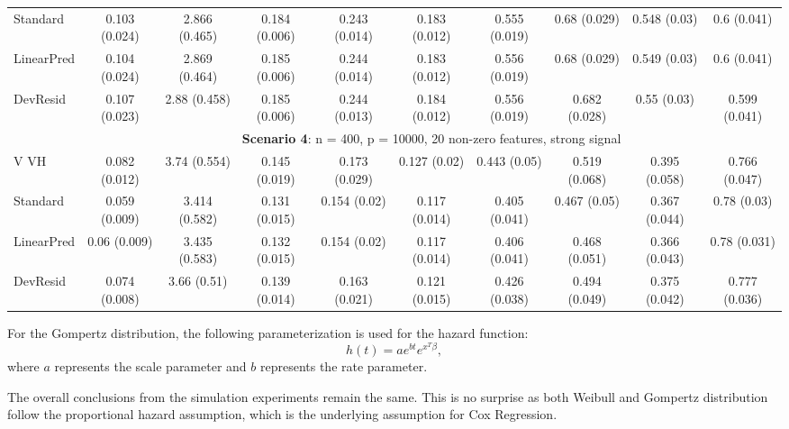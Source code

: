 \documentclass{article}
\begin{document}
\begin{landscape}
\begin{table}[h]
\begin{tabular}[t]{lccccccccc}
Standard  & 0.103 (0.024) & 2.866 (0.465) & 0.184 (0.006) & 0.243 (0.014) & 0.183 (0.012) & 0.555 (0.019) & 0.68 (0.029) & 0.548 (0.03) & 0.6 (0.041) \\ 
LinearPred  & 0.104 (0.024) & 2.869 (0.464) & 0.185 (0.006) & 0.244 (0.014) & 0.183 (0.012) & 0.556 (0.019) & 0.68 (0.029) & 0.549 (0.03) & 0.6 (0.041) \\   
 DevResid  & 0.107 (0.023) & 2.88 (0.458) & 0.185 (0.006) & 0.244 (0.013) & 0.184 (0.012) & 0.556 (0.019) & 0.682 (0.028) & 0.55 (0.03) & 0.599 (0.041) \\
\addlinespace
&\multicolumn{9}{c}{\textbf{Scenario 4}: n = 400, p = 10000, 20 non-zero features, strong signal}\\
\cline{2-10}
 V VH  & 0.082 (0.012) & 3.74 (0.554) & 0.145 (0.019) & 0.173 (0.029) & 0.127 (0.02) & 0.443 (0.05) & 0.519 (0.068) & 0.395 (0.058) & 0.766 (0.047) \\  
Standard  & 0.059 (0.009) & 3.414 (0.582) & 0.131 (0.015) & 0.154 (0.02) & 0.117 (0.014) & 0.405 (0.041) & 0.467 (0.05) & 0.367 (0.044) & 0.78 (0.03) \\   
LinearPred  & 0.06 (0.009) & 3.435 (0.583) & 0.132 (0.015) & 0.154 (0.02) & 0.117 (0.014) & 0.406 (0.041) & 0.468 (0.051) & 0.366 (0.043) & 0.78 (0.031) \\   
 DevResid  & 0.074 (0.008) & 3.66 (0.51) & 0.139 (0.014) & 0.163 (0.021) & 0.121 (0.015) & 0.426 (0.038) & 0.494 (0.049) & 0.375 (0.042) & 0.777 (0.036) \\
\bottomrule
\end{tabular}
\end{table}

For the Gompertz distribution, the following parameterization is used for the hazard function:
$$h(t) = a e^{b t}e^{x^{T}\beta}, $$
where $a$ represents the scale parameter and $b$ represents the rate parameter. 

The overall conclusions from the simulation experiments remain the same. This is no surprise as both Weibull and Gompertz distribution follow the proportional hazard assumption, which is the underlying assumption for Cox Regression.

\begin{table}[h]

\setlength{\tabcolsep}{3pt}


\end{table}
\end{landscape}
\end{document}
